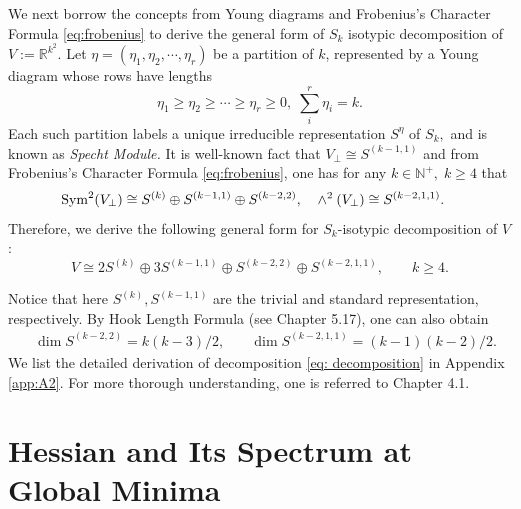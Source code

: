 \documentclass{amsart}%
\begin{document}
\vskip 0.3cm
We next borrow the concepts from Young diagrams and Frobenius's Character Formula \eqref{eq:frobenius} to derive the general form of $S_k$ isotypic decomposition of $V:=\mathbb R^{k^2}.$ Let $\eta=(\eta_1,\eta_2,\cdots, \eta_r)$ be a partition of $k$, represented by a Young diagram whose rows have lengths \[
\eta_1\ge \eta_2\ge\cdots\ge \eta_r\ge 0,\; \sum_i^r \eta_i=k.
\]
Each such partition labels a unique irreducible representation $S^{\eta}$ of $S_k,$ and is known as \textit{Specht Module.} It is well-known fact that $V_{\perp}\cong S^{(k-1,1)}$ and from Frobenius's Character Formula \eqref{eq:frobenius}, one has for any $k\in\mathbb N^+,\; k\ge 4$ that
\begin{align}\label{eq:symwedge}
\operatorname{Sym}^2(V_{\perp})\cong S^{(k)}\oplus S^{(k-1,1)}\oplus S^{(k-2,2)},\quad
&\wedge^2(V_{\perp})\cong S^{(k-2,1,1)}.\notag 
\end{align}
Therefore, we derive the following general form for $S_k$-isotypic decomposition of $V$:
\begin{equation}\label{eq: decomposition}
V\cong2 S^{(k)}\oplus 3 S^{(k-1,1)}\oplus S^{(k-2,2)}\oplus S^{(k-2,1,1)},\qquad  k\ge 4.
\end{equation}

\noindent Notice that here $S^{(k)}, S^{(k-1,1)}$  are the trivial and standard representation, respectively. By Hook Length Formula (see \cite{reprbook} Chapter 5.17), one can also obtain
\begin{align*}
&\dim S^{(k-2,2)}=k(k-3)/2,\quad
&\dim S^{(k-2,1,1)}=(k-1)(k-2)/2.
\end{align*}
We list the detailed derivation of decomposition \eqref{eq: decomposition} in Appendix \ref{app:A2}. For more thorough understanding, one is referred to \cite{fulton2013representation} Chapter 4.1. 
\section{Hessian and 
Its Spectrum at Global Minima}\label{sec:3}
\end{document}
